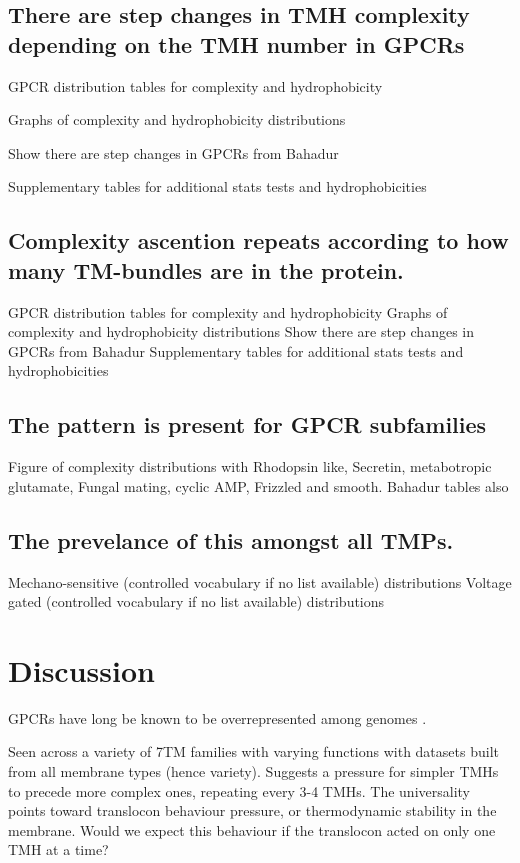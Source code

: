 \subsection{There are step changes in TMH complexity depending on the TMH number in GPCRs}
GPCR distribution tables for complexity and hydrophobicity

Graphs of complexity and hydrophobicity distributions

Show there are step changes in GPCRs from Bahadur

Supplementary tables for additional stats tests and hydrophobicities

\subsection{Complexity ascention repeats according to how many TM-bundles are in the protein.}
GPCR distribution tables for complexity and hydrophobicity
Graphs of complexity and hydrophobicity distributions
Show there are step changes in GPCRs from Bahadur
Supplementary tables for additional stats tests and hydrophobicities

\subsection{The pattern is present for GPCR subfamilies}
Figure of complexity distributions with Rhodopsin like, Secretin, metabotropic glutamate, Fungal mating, cyclic AMP, Frizzled and smooth.
Bahadur tables also

\subsection{The prevelance of this amongst all TMPs.}
Mechano-sensitive (controlled vocabulary if no list available) distributions
Voltage gated (controlled vocabulary if no list available) distributions

\section{Discussion}
GPCRs have long be known to be overrepresented among genomes \cite{Remm2000}.

Seen across a variety of 7TM families with varying functions with datasets built from all membrane types (hence variety).
Suggests a pressure for simpler TMHs to precede more complex ones, repeating every 3-4 TMHs.
The universality points toward translocon behaviour pressure, or thermodynamic stability in the membrane.
Would we expect this behaviour if the translocon acted on only one TMH at a time?
